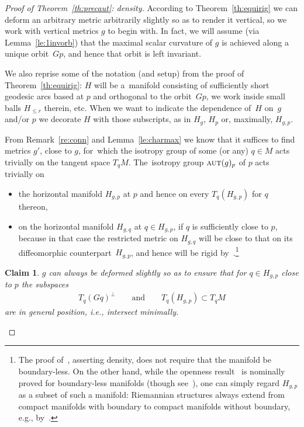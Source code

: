 \documentclass[pdftex]{sigma}%
\numberwithin{equation}{section}
\newtheorem{Claim}[Theorem]{Claim}
 { \theoremstyle{definition}
\newtheorem{Definition}[Theorem]{Definition}
\newtheorem{Note}[Theorem]{Note}
\newtheorem{Example}[Theorem]{Example}
\newtheorem{Notation}[Theorem]{Notation}
\newtheorem{Remark}[Theorem]{Remark} }
\newcommand{\cat}[1]{\textsc{#1}}
\begin{document}
\begin{proof}[Proof of Theorem~\ref{th:precaut}: density]
 According to Theorem~\ref{th:equirig} we can deform an arbitrary metric arbitrarily slightly so as to render it vertical, so we work with vertical metrics $g$ to begin with. In fact, we will assume (via Lemma~\ref{le:1invorb}) that the maximal scalar curvature of $g$ is achieved along a unique orbit~$Gp$, and hence that orbit is left invariant.

 We also reprise some of the notation (and setup) from the proof of Theorem~\ref{th:equirig}: $H$ will be a~manifold consisting of sufficiently short geodesic arcs based at $p$ and orthogonal to the orbit~$Gp$, we work inside small balls $H_{\le r}$ therein, etc. When we want to indicate the dependence of~$H$ on~$g$ and/or $p$ we decorate $H$ with those subscripts, as in $H_g$, $H_p$ or, maximally, $H_{g,p}$.

 From Remark~\ref{re:conn} and Lemma~\ref{le:charmax} we know that it suffices to find metrics $g'$, close to $g$, for~which the isotropy group of some (or any) $q\in M$ acts trivially on the tangent space $T_qM$. The~isotropy group $\cat{aut}(g)_p$ of $p$ acts trivially on
 \begin{itemize}\itemsep=0pt
 \item the horizontal manifold $H_{g,p}$ at $p$ and hence on every $T_q(H_{g,p})$ for $q$ thereon,
 \item on the horizontal manifold $H_{g,q}$ at $q\in H_{g,p}$, if $q$ is sufficiently close to $p$, because in that case the restricted metric on $H_{g,q}$ will be close to that on its diffeomorphic counterpart~$H_{g,p}$, and hence will be rigid by~\cite[Corollary~8.2 and Proposition~8.3]{eb}.\footnote{The proof of~\cite[Proposition~8.3]{eb}, asserting density, does not require that the manifold be boundary-less. On the other hand, while the openness result~\cite[Corollary~8.2]{eb} is nominally proved for boundary-less manifolds (though see~\cite[p.~11, footnote~3]{eb}), one can simply regard $H_{g,p}$ as a subset of such a manifold: Riemannian structures always extend from compact manifolds with boundary to compact manifolds without boundary, e.g., by~\cite[Theorem~A]{pv}.}
 \end{itemize}

 \begin{Claim}
 $g$ can always be deformed slightly so as to ensure that for $q\in H_{g,p}$ close to $p$ the subspaces
 \begin{gather}\label{eq:2sp}
 T_q(Gq)^{\perp}\qquad\text{and}\qquad T_q(H_{g,p})\subset T_qM
 \end{gather}
 are in general position, i.e., intersect minimally.
 \end{Claim}


\end{proof}
\end{document}
